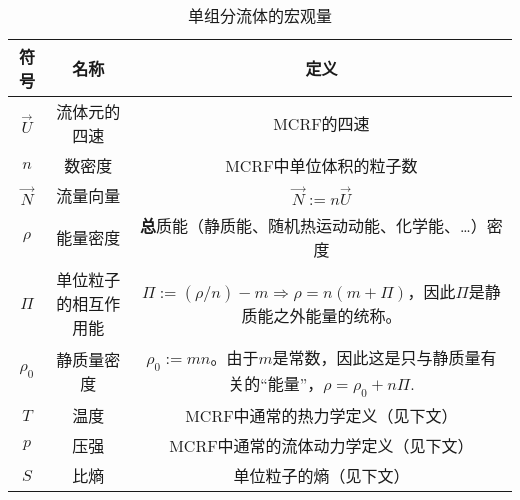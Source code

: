 \begin{table}[h]
\centering
\begin{tabular}{c c c}
\toprule
符号 & 名称 & 定义 \\
\midrule
$\vec{U}$ & 流体元的四速 & MCRF的四速 \\
$n$ & 数密度 & MCRF中单位体积的粒子数 \\
$\vec{N}$ & 流量向量 & $\vec{N} := n \vec{U}$ \\
$\rho$ & 能量密度 & \textbf{总}质能（静质能、随机热运动动能、化学能、…）密度 \\
$\Pi$ & 单位粒子的相互作用能 & $\Pi := (\rho/n) - m \Rightarrow \rho = n(m + \Pi) $，因此$\Pi$是静质能之外能量的统称。 \\
$\rho_0$ & 静质量密度 & $\rho_0 := mn$。由于$m$是常数，因此这是只与静质量有关的“能量”，$\rho = \rho_0 + n \Pi$. \\
$T$ & 温度 & MCRF中通常的热力学定义（见下文） \\
$p$ & 压强 & MCRF中通常的流体动力学定义（见下文） \\
$S$ & 比熵 & 单位粒子的熵（见下文）\\
\bottomrule
\end{tabular}
\caption{单组分流体的宏观量}
\end{table}

